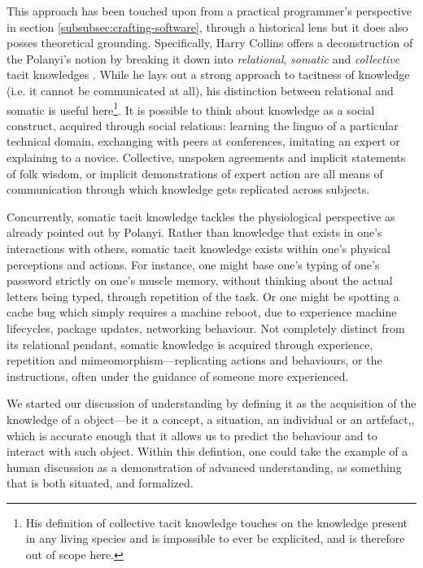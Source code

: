 This approach has been touched upon from a practical programmer's perspective in section \ref{subsubsec:crafting-software}, through a historical lens but it does also posses theoretical grounding. Specifically, Harry Collins offers a deconstruction of the Polanyi's notion by breaking it down into \emph{relational}, \emph{somatic} and \emph{collective} tacit knowledges \citep{collins_tacit_2010}. While he lays out a strong approach to tacitness of knowledge (i.e. it cannot be communicated at all), his distinction between relational and somatic is useful here\footnote{His definition of collective tacit knowledge touches on the knowledge present in any living species and is impossible to ever be explicited, and is therefore out of scope here.}. It is possible to think about knowledge as a social construct, acquired through social relations: learning the linguo of a particular technical domain, exchanging with peers at conferences, imitating an expert or explaining to a novice. Collective, unspoken agreements and implicit statements of folk wisdom, or implicit demonstrations of expert action are all means of communication through which knowledge gets replicated across subjects.

Concurrently, somatic tacit knowledge tackles the physiological perspective as already pointed out by Polanyi. Rather than knowledge that exists in one's interactions with others, somatic tacit knowledge exists within one's physical perceptions and actions. For instance, one might base one's typing of one's password strictly on one's muscle memory, without thinking about the actual letters being typed, through repetition of the task. Or one might be spotting a cache bug which simply requires a machine reboot, due to experience machine lifecycles, package updates, networking behaviour. Not completely distinct from its relational pendant, somatic knowledge is acquired through experience, repetition and mimeomorphism—replicating actions and behaviours, or the instructions, often under the guidance of someone more experienced.

\spacer

We started our discussion of understanding by defining it as the acquisition of the knowledge of a object—be it a concept, a situation, an individual or an artfefact,, which is accurate enough that it allows us to predict the behaviour and to interact with such object. Within this defintion, one could take the example of a human discussion as a demonstration of advanced understanding, as something that is both situated, and formalized.

